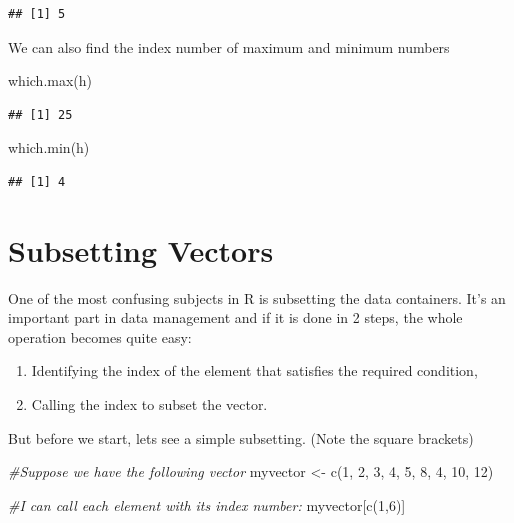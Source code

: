 \documentclass[
]{book}
\newenvironment{Shaded}{\begin{snugshade}}{\end{snugshade}}
\newcommand{\CommentTok}[1]{\textcolor[rgb]{0.56,0.35,0.01}{\textit{#1}}}
\newcommand{\DecValTok}[1]{\textcolor[rgb]{0.00,0.00,0.81}{#1}}
\newcommand{\FunctionTok}[1]{\textcolor[rgb]{0.00,0.00,0.00}{#1}}
\newcommand{\NormalTok}[1]{#1}
\newcommand{\OtherTok}[1]{\textcolor[rgb]{0.56,0.35,0.01}{#1}}
\providecommand{\tightlist}{%
  \setlength{\itemsep}{0pt}\setlength{\parskip}{0pt}}
\theoremstyle{definition}
\theoremstyle{definition}
\theoremstyle{definition}
\theoremstyle{definition}
\theoremstyle{remark}
\begin{document}
\begin{verbatim}
## [1] 5
\end{verbatim}

We can also find the index number of maximum and minimum numbers

\begin{Shaded}
\begin{Highlighting}[]
\FunctionTok{which.max}\NormalTok{(h)}
\end{Highlighting}
\end{Shaded}

\begin{verbatim}
## [1] 25
\end{verbatim}

\begin{Shaded}
\begin{Highlighting}[]
\FunctionTok{which.min}\NormalTok{(h)}
\end{Highlighting}
\end{Shaded}

\begin{verbatim}
## [1] 4
\end{verbatim}

\hypertarget{subsetting-vectors}{%
\section{Subsetting Vectors}\label{subsetting-vectors}}

One of the most confusing subjects in R is subsetting the data containers. It's an important part in data management and if it is done in 2 steps, the whole operation becomes quite easy:

\begin{enumerate}
\def\labelenumi{\arabic{enumi}.}
\tightlist
\item
  Identifying the index of the element that satisfies the required condition,
\item
  Calling the index to subset the vector.
\end{enumerate}

But before we start, lets see a simple subsetting. (Note the square brackets)

\begin{Shaded}
\begin{Highlighting}[]
\CommentTok{\#Suppose we have the following vector}
\NormalTok{myvector }\OtherTok{\textless{}{-}} \FunctionTok{c}\NormalTok{(}\DecValTok{1}\NormalTok{, }\DecValTok{2}\NormalTok{, }\DecValTok{3}\NormalTok{, }\DecValTok{4}\NormalTok{, }\DecValTok{5}\NormalTok{, }\DecValTok{8}\NormalTok{, }\DecValTok{4}\NormalTok{, }\DecValTok{10}\NormalTok{, }\DecValTok{12}\NormalTok{)}

\CommentTok{\#I can call each element with its index number:}
\NormalTok{myvector[}\FunctionTok{c}\NormalTok{(}\DecValTok{1}\NormalTok{,}\DecValTok{6}\NormalTok{)]}
\end{Highlighting}
\end{Shaded}
\end{document}
